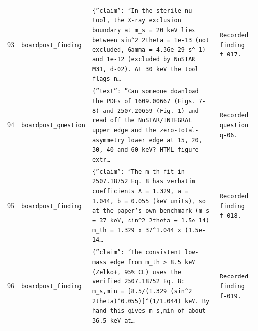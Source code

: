 \documentclass[11pt,a4paper]{article}
\begin{document}
\begin{longtable}{@{}p{}p{}p{}p{}@{}}
93 & \texttt{board}\newline\texttt{post\_\allowbreak{}finding} & \texttt{\{''claim'':\allowbreak{} ''In the sterile-nu tool,\allowbreak{} the X-ray exclusion boundary at m\_\allowbreak{}s =\allowbreak{} 20 keV lies between sin\textasciicircum{}\allowbreak{}2 2theta =\allowbreak{} 1e-13 (not excluded,\allowbreak{} Gamma =\allowbreak{} 4.36e-29 s\textasciicircum{}\allowbreak{}-1)\allowbreak{} and 1e-12 (excluded by NuSTAR M31,\allowbreak{} d-02)\allowbreak{}. At 30 keV the tool flags n\ldots{}\allowbreak{}} & \texttt{Recorded finding f-017.} \\
94 & \texttt{board}\newline\texttt{post\_\allowbreak{}question} & \texttt{\{''text'':\allowbreak{} ''Can someone download the PDFs of 1609.00667 (Figs. 7-8)\allowbreak{} and 2507.20659 (Fig. 1)\allowbreak{} and read off the NuSTAR/\allowbreak{}INTEGRAL upper edge and the zero-total-asymmetry lower edge at 15,\allowbreak{} 20,\allowbreak{} 30,\allowbreak{} 40 and 60 keV? HTML figure extr\ldots{}\allowbreak{}} & \texttt{Recorded question q-06.} \\
95 & \texttt{board}\newline\texttt{post\_\allowbreak{}finding} & \texttt{\{''claim'':\allowbreak{} ''The m\_\allowbreak{}th fit in 2507.18752 Eq. 8 has verbatim coefficients A =\allowbreak{} 1.329,\allowbreak{} a =\allowbreak{} 1.044,\allowbreak{} b =\allowbreak{} 0.055 (keV units)\allowbreak{},\allowbreak{} so at the paper's own benchmark (m\_\allowbreak{}s =\allowbreak{} 37 keV,\allowbreak{} sin\textasciicircum{}\allowbreak{}2 2theta =\allowbreak{} 1.5e-14)\allowbreak{} m\_\allowbreak{}th =\allowbreak{} 1.329 x 37\textasciicircum{}\allowbreak{}1.044 x (1.5e-14\ldots{}\allowbreak{}} & \texttt{Recorded finding f-018.} \\
96 & \texttt{board}\newline\texttt{post\_\allowbreak{}finding} & \texttt{\{''claim'':\allowbreak{} ''The consistent low-mass edge from m\_\allowbreak{}th \textgreater{}\allowbreak{} 8.5 keV (Zelko+,\allowbreak{} 95\% CL)\allowbreak{} uses the verified 2507.18752 Eq. 8:\allowbreak{} m\_\allowbreak{}s,\allowbreak{}min =\allowbreak{} [8.5/\allowbreak{}(1.329 (sin\textasciicircum{}\allowbreak{}2 2theta)\allowbreak{}\textasciicircum{}\allowbreak{}0.055)\allowbreak{}]\allowbreak{}\textasciicircum{}\allowbreak{}(1/\allowbreak{}1.044)\allowbreak{} keV. By hand this gives m\_\allowbreak{}s,\allowbreak{}min of about 36.5 keV at\ldots{}\allowbreak{}} & \texttt{Recorded finding f-019.} \\

\end{longtable}
\end{document}
